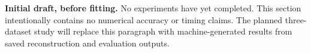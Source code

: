 \textbf{Initial draft, before fitting.} No experiments have yet completed. This section intentionally contains no numerical accuracy or timing claims. The planned three-dataset study will replace this paragraph with machine-generated results from saved reconstruction and evaluation outputs.
